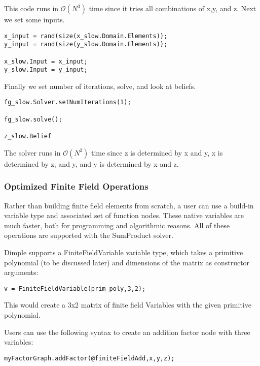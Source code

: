 This code runs in $\mathcal{O}(N^3) $ time since it tries all combinations of x,y, and z.
Next we set some inputs.

\begin{lstlisting}
x_input = rand(size(x_slow.Domain.Elements));
y_input = rand(size(y_slow.Domain.Elements));

x_slow.Input = x_input;
y_slow.Input = y_input;
\end{lstlisting}

Finally we set number of iterations, solve, and look at beliefs.

\begin{lstlisting}
fg_slow.Solver.setNumIterations(1);

fg_slow.solve();

z_slow.Belief
\end{lstlisting}

The solver runs in $\mathcal{O}(N^2)$ time since z is determined by x and y, x is determined by z, and y, and y is determined by x and z.

\subsubsection{Optimized Finite Field Operations}

Rather than building finite field elements from scratch, a user can use a build-in variable type and associated set of function nodes. These native variables are much faster, both for programming and algorithmic reasons. All of these operations are supported with the SumProduct solver.


Dimple supports a FiniteFieldVariable variable type, which takes a primitive polynomial (to be discussed later) and dimensions of the matrix as constructor arguments:

\begin{lstlisting}
v = FiniteFieldVariable(prim_poly,3,2);
\end{lstlisting}

This would create a 3x2 matrix of finite field Variables with the given primitive polynomial.


Users can use the following syntax to create an addition factor node with three variables:

\begin{lstlisting}
myFactorGraph.addFactor(@finiteFieldAdd,x,y,z);
\end{lstlisting}

